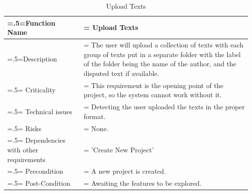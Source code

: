 \documentclass[12pt]{article}
\begin{document}
\begin{center}
    \begin{table}[H]
        \caption{Upload Texts}
        \begin{tabularx}{\textwidth} {
                | >{\raggedright\arraybackslash\hsize=.5\hsize\linewidth=\hsize}X
                | >{\raggedright\arraybackslash\hsize=1.5\hsize\linewidth=\hsize}X |}
            \hline
            Function Name                        & Upload Texts                                                                                                                                                                                \\ \hline
            Description                          & The user will upload a collection of texts with each group of texts put in a separate folder with the label of the folder being the name of the author, and the disputed text if available. \\ \hline
            Criticality                          & This requirement is the opening point of the project, so the system cannot work without it.                                                                                                 \\ \hline
            Technical issues                     & Detecting the user uploaded the texts in the proper format.                                                                                                                                 \\ \hline
            Risks                                & None.                                                                                                                                                                                       \\ \hline
            Dependencies with other requirements & 'Create New Project'                                                                                                                                                                        \\ \hline
            Precondition                         & A new project is created.                                                                                                                                                                   \\ \hline
            Post-Condition                       & Awaiting the features to be explored.                                                                                                                                                       \\ \hline
        \end{tabularx}
    \end{table}
\end{center}
\end{document}
